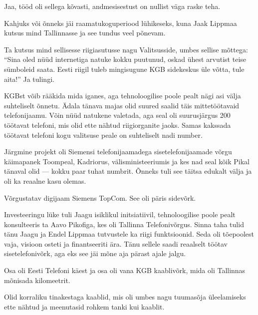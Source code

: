 Jaa, tööd oli sellega kõvasti, andmesisestust on nullist väga raske teha.

Kahjuks või õnneks jäi raamatukoguperiood 
lühikeseks, kuna Jaak Lippmaa kutsus mind 
Tallinnasse ja see tundus veel põnevam. 

Ta kutsus mind sellisesse riigiasutusse nagu Valitsusside, 
umbes sellise mõttega: \enquote{Sina oled nüüd internetiga natuke 
kokku puutunud, oskad ühest arvutist teise sümboleid saata. Eesti riigil tuleb mingisugune 
KGB sidekeskus üle võtta, tule aita!} Ja tulingi.

KGBst võib rääkida mida iganes, aga tehnoloogilise poole 
pealt nägi asi välja suhteliselt õnnetu. Ädala tänava 
majas olid suured saalid täis mittetöötavaid 
telefonijaamu. Võin nüüd natukene valetada, aga seal oli suurusjärgus 200 
töötavat telefoni, mis olid ette nähtud riigiorganite jaoks. Samas kakssada töötavat telefoni kogu valitsuse peale 
on suhteliselt nadi number.

Järgmine projekt oli Siemensi telefonijaamadega sisetelefonijaamade 
võrgu käimapanek Toompeal, Kadriorus, välisministeeriumis ja kes nad seal 
kõik Pikal tänaval olid --- kokku paar tuhat numbrit. Õnneks tuli see täitsa 
edukalt välja ja oli ka reaalne kasu olemas.


Võrgustatav digijaam Siemens TopCom. See oli päris sidevõrk.


Investeeringu lüke tuli Jaagu isiklikul initsiatiivil, 
tehnoloogilise poole pealt konsulteeris ta Aavo Pikofiga, 
kes oli Tallinna Telefonivõrgus. Sinna taha tulid tänu Jaagu ja Endel 
Lippmaa tutvustele ka riigi funktsioonid. Seda oli 
tõepoolest vaja, visioon osteti ja finantseeriti ära. Tänu sellele saadi reaalselt 
töötav sisetelefonivõrk, aga eks see jäi mõne aja pärast ajale jalgu.


Osa oli Eesti Telefoni käest ja osa oli vana KGB kaablivõrk, mida oli 
Tallinnas mõnisada kilomeetrit.


Olid korraliku tinakestaga kaablid, mis oli umbes nagu tuumasõja üleelamiseks 
ette nähtud ja meenutasid rohkem tanki kui kaablit.

